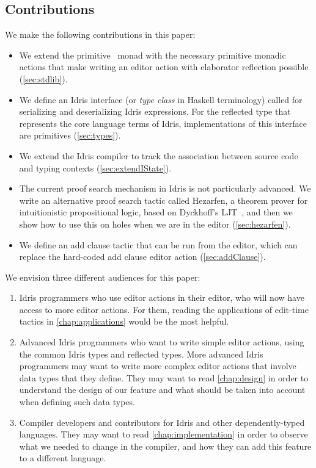 \subsection{Contributions}

We make the following contributions in this paper:
\begin{itemize}
\item We extend the primitive \Elab\ monad with the necessary primitive monadic
actions that make writing an editor action with elaborator reflection possible
(\autoref{sec:stdlib}).
\item We define an Idris interface (or \emph{type class} in Haskell terminology)
called  for serializing and deserializing Idris expressions.
For the reflected type that represents the core language terms of Idris,
implementations of this interface are primitives (\autoref{sec:types}).
\item We extend the Idris compiler to track the association between source code
  and typing contexts (\autoref{sec:extendIState}).
\item The current proof search mechanism in Idris is not particularly advanced.
We write an alternative proof search tactic called Hezarfen, a
theorem prover for intuitionistic propositional logic, based on Dyckhoff's
LJT~\cite{ljt}, and then we show how to use this on holes when we are in
the editor (\autoref{sec:hezarfen}).
\item We define an add clause tactic that can be run from the editor, which can
replace the hard-coded add clause editor action (\autoref{sec:addClause}).
\end{itemize}


We envision three different audiences for this paper:
\begin{enumerate}[(1)]
\item Idris programmers who use editor actions in their editor, who will now
  have access to more editor actions. For them, reading the applications of
edit-time tactics in \autoref{chap:applications} would be the most helpful.
\item Advanced Idris programmers who want to write simple editor actions, using
  the common Idris types and reflected types. More advanced Idris programmers
    may want to write more complex editor actions that involve data types
    that they define.
    They may want to read \autoref{chap:design} in order to understand the
    design of our feature and what should be taken into account when defining
    such data types.
\item Compiler developers and contributors for Idris and other
  dependently-typed languages.  They may want to read
    \autoref{chap:implementation} in order to observe what we needed to change
    in the compiler, and how they can add this feature to a different language.
\end{enumerate}
